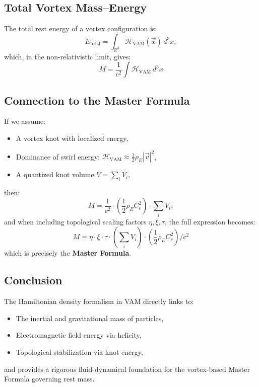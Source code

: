 \subsection*{Total Vortex Mass–Energy}

The total rest energy of a vortex configuration is:
\begin{equation}
E_\text{total} = \int_{\mathbb{R}^3} \mathcal{H}_\text{VAM}(\vec{x}) \, d^3x,
\end{equation}
which, in the non-relativistic limit, gives:
\[
M = \frac{1}{c^2} \int \mathcal{H}_\text{VAM} \, d^3x
\]

\subsection*{Connection to the Master Formula}

If we assume:
\begin{itemize}
    \item A vortex knot with localized energy,
    \item Dominance of swirl energy: \( \mathcal{H}_\text{VAM} \approx \frac{1}{2} \rho_{\scriptscriptstyle\boldsymbol\!E}|\vec{v}|^2 \),
    \item A quantized knot volume \( V = \sum_i V_i \),
\end{itemize}
then:
\[
M = \frac{1}{c^2} \cdot \left( \frac{1}{2} \rho_{\scriptscriptstyle\boldsymbol\!E}C_e^2 \right) \cdot \sum_i V_i,
\]
and when including topological scaling factors \( \eta, \xi, \tau \), the full expression becomes:
\[
M = \eta \cdot \xi \cdot \tau \cdot \left( \sum_i V_i \right) \cdot \left( \frac{1}{2} \rho_{\scriptscriptstyle\boldsymbol\!E}C_e^2 \right) / c^2
\]
which is precisely the \textbf{Master Formula}.

\subsection*{Conclusion}

The Hamiltonian density formalism in VAM directly links to:
\begin{itemize}
    \item The inertial and gravitational mass of particles,
    \item Electromagnetic field energy via helicity,
    \item Topological stabilization via knot energy,
\end{itemize}
and provides a rigorous fluid-dynamical foundation for the vortex-based Master Formula governing rest mass.